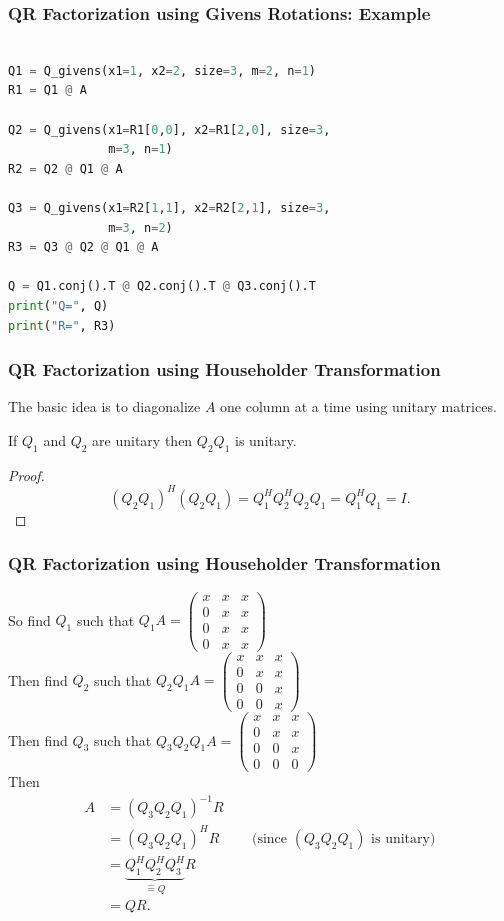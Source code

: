 \documentclass{beamer}
\begin{document}
\begin{frame}[fragile]\frametitle{QR Factorization using Givens Rotations: Example}
\begin{lstlisting}[language=Python]

Q1 = Q_givens(x1=1, x2=2, size=3, m=2, n=1)
R1 = Q1 @ A

Q2 = Q_givens(x1=R1[0,0], x2=R1[2,0], size=3, 
              m=3, n=1)
R2 = Q2 @ Q1 @ A

Q3 = Q_givens(x1=R2[1,1], x2=R2[2,1], size=3, 
              m=3, n=2)
R3 = Q3 @ Q2 @ Q1 @ A

Q = Q1.conj().T @ Q2.conj().T @ Q3.conj().T
print("Q=", Q)
print("R=", R3)

\end{lstlisting}
\end{frame}



\begin{frame}\frametitle{QR Factorization using Householder Transformation}
	The basic idea is to diagonalize $A$ one column at a time using unitary matrices.  
	\begin{lemma}
		If 	$Q_1$ and $Q_2$ are unitary then $Q_2Q_1$ is unitary.
	\end{lemma}
	\begin{proof}
		\[ 
			(Q_2Q_1)^H(Q_2Q_1) 
				= Q_1^HQ_2^HQ_2Q_1 
				= Q_1^HQ_1 
				= I.
		\]
	\end{proof}
\end{frame}

\begin{frame}\frametitle{QR Factorization using Householder Transformation}
	So find $Q_1$ such that 
		$Q_1A = \begin{pmatrix}x&x&x\\0&x&x\\0&x&x\\0&x&x\end{pmatrix}$
		\\
	Then find $Q_2$ such that 
		$Q_2Q_1A = \begin{pmatrix}x&x&x\\0&x&x\\0&0&x\\0&0&x\end{pmatrix}$
		\\
	Then find $Q_3$ such that 
		$Q_3Q_2Q_1A = \begin{pmatrix}x&x&x\\0&x&x\\0&0&x\\0&0&0\end{pmatrix}$
		\\
	Then 
	\begin{align*}
	A &= (Q_3Q_2Q_1)^{-1}R\\
	&= (Q_3Q_2Q_1)^HR \qquad \text{ (since $(Q_3Q_2Q_1)$ is unitary)}\\
	&= \underbrace{Q_1^HQ_2^HQ_3^H}_{\hat{=}Q}R\\
	&= QR.
	\end{align*}
\end{frame}
\end{document}
